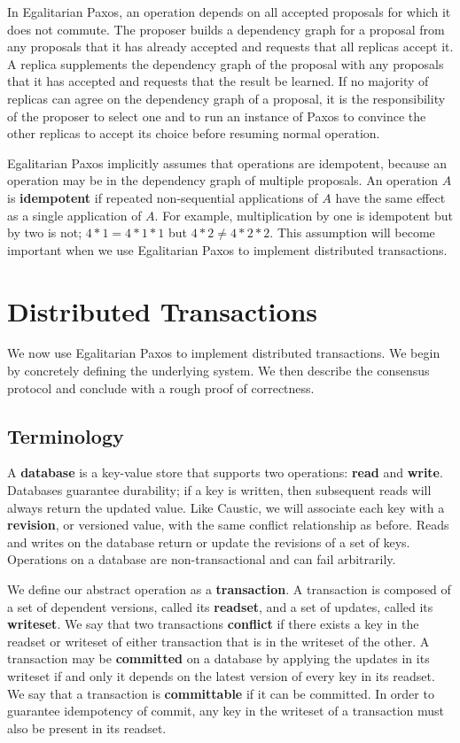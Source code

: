 \documentclass[../main.tex]{subfiles}
\begin{document}
  In Egalitarian Paxos, an operation depends on all accepted proposals for which it does not
  commute. The proposer builds a dependency graph for a proposal from any proposals that it has
  already accepted and requests that all replicas accept it. A replica supplements the dependency
  graph of the proposal with any proposals that it has accepted and requests that the result be
  learned. If no majority of replicas can agree on the dependency graph of a proposal, it is the
  responsibility of the proposer to select one and to run an instance of Paxos to convince the
  other replicas to accept its choice before resuming normal operation.

  Egalitarian Paxos implicitly assumes that operations are idempotent, because an operation may be
  in the dependency graph of multiple proposals. An operation $A$ is \textbf{idempotent} if repeated
  non-sequential applications of $A$ have the same effect as a single application of $A$. For
  example, multiplication by one is idempotent but by two is not; $4 * 1 = 4 * 1 * 1$ but
  $4 * 2 \ne 4 * 2 * 2$. This assumption will become important when we use Egalitarian Paxos to
  implement distributed transactions.

\section{Distributed Transactions}
We now use Egalitarian Paxos to implement distributed transactions. We begin by concretely
defining the underlying system. We then describe the consensus protocol and conclude with a rough
proof of correctness.

  \subsection{Terminology}
  A \textbf{database} is a key-value store that supports two operations: \textbf{read} and
  \textbf{write}. Databases guarantee durability; if a key is written, then subsequent
  reads will always return the updated value. Like Caustic, we will associate each key with a
  \textbf{revision}, or versioned value, with the same conflict relationship as before. Reads and
  writes on the database return or update the revisions of a set of keys. Operations on a database
  are non-transactional and can fail arbitrarily.

  We define our abstract operation as a \textbf{transaction}. A transaction is composed of a set
  of dependent versions, called its \textbf{readset}, and a set of updates, called its
  \textbf{writeset}. We say that two transactions \textbf{conflict} if there exists a key in the
  readset or writeset of either transaction that is in the writeset of the other. A transaction may
  be \textbf{committed} on a database by applying the updates in its writeset if and only it
  depends on the latest version of every key in its readset. We say that a transaction is
  \textbf{committable} if it can be committed. In order to guarantee idempotency of commit, any key
  in the writeset of a transaction must also be present in its readset.
\end{document}
